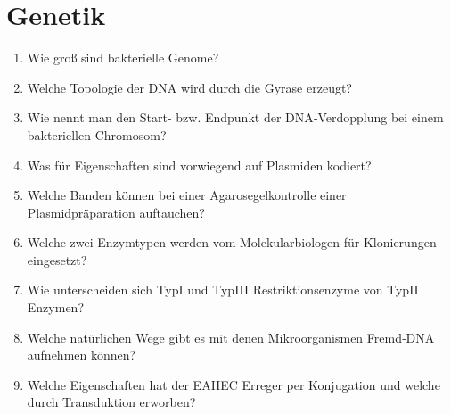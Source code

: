 \section{Genetik}

\begin{enumerate}
		        \item Wie groß sind bakterielle Genome?
					          \item Welche Topologie der DNA wird durch die Gyrase erzeugt?
									         \item Wie nennt man den Start- bzw. Endpunkt der DNA‐Verdopplung bei einem bakteriellen Chromosom?
													        \item Was für Eigenschaften sind vorwiegend auf Plasmiden kodiert?
																          \item Welche Banden können bei einer Agarosegelkontrolle einer Plasmidpräparation auftauchen?
																				         \item Welche zwei Enzymtypen werden vom Molekularbiologen für Klonierungen eingesetzt?
																								        \item Wie unterscheiden sich TypI und TypIII Restriktionsenzyme von TypII Enzymen?
																											          \item Welche natürlichen Wege gibt es mit denen Mikroorganismen Fremd‐DNA aufnehmen können?
																															         \item Welche Eigenschaften hat der EAHEC Erreger per Konjugation und welche durch Transduktion erworben?
																																	\end{enumerate}

